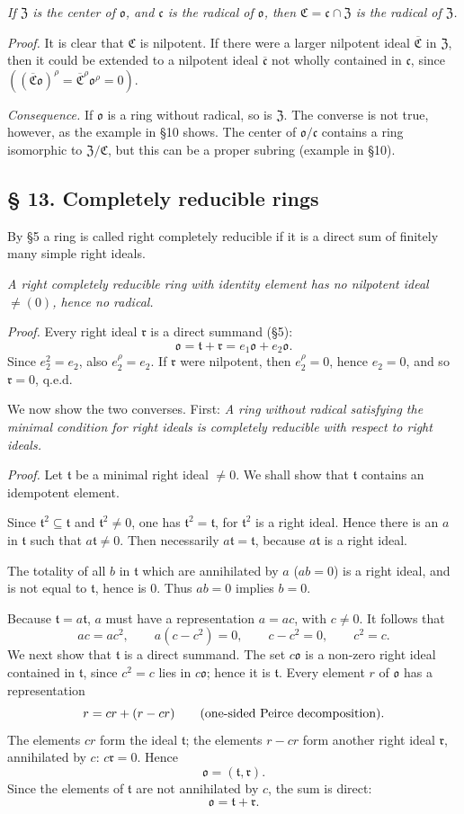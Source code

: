 \documentclass[11pt]{article}
\providecommand{\mC}{\mathfrak{C}}
\providecommand{\mo}{\mathfrak{o}}
\providecommand{\mc}{\mathfrak{c}}
\providecommand{\mr}{\mathfrak{r}}
\providecommand{\mt}{\mathfrak{t}}
\providecommand{\mZ}{\mathfrak{Z}}
\begin{document}
\emph{If $\mZ$ is the center of $\mo$, and $\mc$ is the radical of $\mo$, then $\mC=\mc\cap\mZ$ is the radical of $\mZ$.}

\emph{Proof.} It is clear that $\mC$ is nilpotent. If there were a larger nilpotent ideal $\overline{\mC}$ in $\mZ$, then it could be extended to a nilpotent ideal $\overline{\mc}$ not wholly contained in $\mc$, since $((\overline{\mC}\mo)^\rho=\overline{\mC}^{\rho}\mo^\rho=0)$.

\emph{Consequence.} If $\mo$ is a ring without radical, so is $\mZ$. The converse is not true, however, as the example in §10 shows. The center of $\mo/\mc$ contains a ring isomorphic to $\mZ/\mC$, but this can be a proper subring (example in §10).

\subsection*{§ 13. Completely reducible rings}

By §5 a ring is called right completely reducible if it is a direct sum of finitely many simple right ideals.

\emph{A right completely reducible ring with identity element has no nilpotent ideal $\ne(0)$, hence no radical.}

\emph{Proof.} Every right ideal $\mr$ is a direct summand (§5):
\[
        \mo=\mt+\mr=e_1\mo+e_2\mo.
\]
Since $e_2^2=e_2$, also $e_2^\rho=e_2$. If $\mr$ were nilpotent, then $e_2^\rho=0$, hence $e_2=0$, and so $\mr=0$, q.e.d.

We now show the two converses. First: \emph{A ring without radical satisfying the minimal condition for right ideals is completely reducible with respect to right ideals.}

\emph{Proof.} Let $\mt$ be a minimal right ideal $\ne0$. We shall show that $\mt$ contains an idempotent element.

Since $\mt^2\subseteq\mt$ and $\mt^2\ne0$, one has $\mt^2=\mt$, for $\mt^2$ is a right ideal. Hence there is an $a$ in $\mt$ such that $a\mt\ne0$. Then necessarily $a\mt=\mt$, because $a\mt$ is a right ideal.

The totality of all $b$ in $\mt$ which are annihilated by $a$ ($ab=0$) is a right ideal, and is not equal to $\mt$, hence is $0$. Thus $ab=0$ implies $b=0$.

Because $\mt=a\mt$, $a$ must have a representation $a=ac$, with $c\ne0$. It follows that
\[
        ac=ac^2,
        \qquad a(c-c^2)=0,
        \qquad c-c^2=0,
        \qquad c^2=c.
\]
We next show that $\mt$ is a direct summand. The set $c\mo$ is a non-zero right ideal contained in $\mt$, since $c^2=c$ lies in $c\mo$; hence it is $\mt$. Every element $r$ of $\mo$ has a representation
\[
        r=cr+(r-cr) \qquad \hbox{(one-sided Peirce decomposition).}
\]
The elements $cr$ form the ideal $\mt$; the elements $r-cr$ form another right ideal $\mr$, annihilated by $c$: $c\mr=0$. Hence
\[
        \mo=(\mt,\mr).
\]
Since the elements of $\mt$ are not annihilated by $c$, the sum is direct:
\begin{equation}
        \mo=\mt+\mr.                                             \tag{1}
\end{equation}
\end{document}
